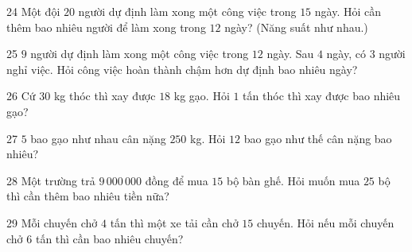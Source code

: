 \gap
\begin{probbox}{24}{\relax}
Một đội $20$ người dự định làm xong một công việc trong $15$ ngày. Hỏi cần thêm bao nhiêu người để làm xong trong $12$ ngày? (Năng suất như nhau.)
\end{probbox}
\gap
\begin{probbox}{25}{\relax}
$9$ người dự định làm xong một công việc trong $12$ ngày. Sau $4$ ngày, có $3$ người nghỉ việc. Hỏi công việc hoàn thành chậm hơn dự định bao nhiêu ngày?
\end{probbox}
\gap
\begin{probbox}{26}{\relax}
Cứ $30$ kg thóc thì xay được $18$ kg gạo. Hỏi $1$ tấn thóc thì xay được bao nhiêu gạo?
\end{probbox}
\gap
\begin{probbox}{27}{\relax}
$5$ bao gạo như nhau cân nặng $250$ kg. Hỏi $12$ bao gạo như thế cân nặng bao nhiêu?
\end{probbox}
\gap
\begin{probbox}{28}{\relax}
Một trường trả $9\,000\,000$ đồng để mua $15$ bộ bàn ghế. Hỏi muốn mua $25$ bộ thì cần thêm bao nhiêu tiền nữa?
\end{probbox}
\gap
\begin{probbox}{29}{\relax}
Mỗi chuyến chở $4$ tấn thì một xe tải cần chở $15$ chuyến. Hỏi nếu mỗi chuyến chở $6$ tấn thì cần bao nhiêu chuyến?
\end{probbox}
